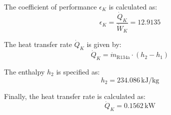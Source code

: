 The coefficient of performance \( \epsilon_K \) is calculated as:  
\[
\epsilon_K = \frac{\dot{Q}_K}{\dot{W}_K} = 12.9135
\]

The heat transfer rate \( \dot{Q}_K \) is given by:  
\[
\dot{Q}_K = \dot{m}_{\text{R134a}} \cdot (h_2 - h_1)
\]

The enthalpy \( h_2 \) is specified as:  
\[
h_2 = 234.086 \, \text{kJ/kg}
\]

Finally, the heat transfer rate is calculated as:  
\[
\dot{Q}_K = 0.1562 \, \text{kW}
\]